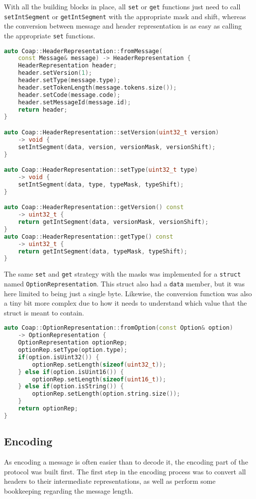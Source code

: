 \documentclass[a4paper, titlepage,12pt]{article}
\begin{document}
			With all the building blocks in place, all \lstinline{set} or \lstinline{get} functions just need to call \lstinline{setIntSegment} or \lstinline{getIntSegment} with the appropriate mask and shift, whereas the conversion between message and header representation is as easy as calling the appropriate \lstinline{set} functions.

	\begin{lstlisting}[language=C++]
auto Coap::HeaderRepresentation::fromMessage(
	const Message& message) -> HeaderRepresentation {
	HeaderRepresentation header;
	header.setVersion(1);
	header.setType(message.type);
	header.setTokenLength(message.tokens.size());
	header.setCode(message.code);
	header.setMessageId(message.id);
	return header;
}

auto Coap::HeaderRepresentation::setVersion(uint32_t version) 
	-> void {
	setIntSegment(data, version, versionMask, versionShift);
}

auto Coap::HeaderRepresentation::setType(uint32_t type) 
	-> void {
	setIntSegment(data, type, typeMask, typeShift);
}

auto Coap::HeaderRepresentation::getVersion() const 
	-> uint32_t {
	return getIntSegment(data, versionMask, versionShift);
}
auto Coap::HeaderRepresentation::getType() const 
	-> uint32_t {
	return getIntSegment(data, typeMask, typeShift);
}
	\end{lstlisting}

			The same \lstinline{set} and \lstinline{get} strategy with the masks was implemented for a \lstinline{struct} named \lstinline{OptionRepresentation}. This struct also had a \lstinline{data} member, but it was here limited to being just a single byte. Likewise, the conversion function was also a tiny bit more complex due to how it needs to understand which value that the struct is meant to contain.

	\begin{lstlisting}[language=C++]
auto Coap::OptionRepresentation::fromOption(const Option& option) 
	-> OptionRepresentation {
	OptionRepresentation optionRep;
	optionRep.setType(option.type);
	if(option.isUint32()) {
		optionRep.setLength(sizeof(uint32_t));
	} else if(option.isUint16()) {
		optionRep.setLength(sizeof(uint16_t));
	} else if(option.isString()) {
		optionRep.setLength(option.string.size());
	}
	return optionRep;
}
	\end{lstlisting}

		\subsection{Encoding}
		As encoding a message is often easier than to decode it, the encoding part of the protocol was built first. The first step in the encoding process was to convert all headers to their intermediate representations, as well as perform some bookkeeping regarding the message length.
\end{document}

